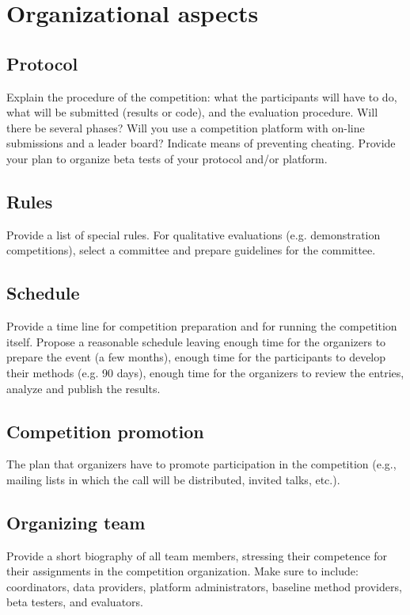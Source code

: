 \documentclass[11pt, oneside]{article}
\begin{document}
\section{Organizational aspects}
\subsection{Protocol}

Explain the procedure of the competition: what the participants will have to do, what will be submitted (results or code), and the evaluation procedure.
Will there be several phases? Will you use a competition platform with on-line submissions and a leader board? Indicate means of preventing cheating.
Provide your plan to organize beta tests of your protocol and/or platform.


\subsection{Rules}

Provide a list of special rules. 
For qualitative evaluations (e.g. demonstration competitions), select a committee and prepare guidelines for the committee.

\subsection{Schedule}

Provide a time line for competition preparation and for running the competition itself. Propose a reasonable schedule leaving enough time for the organizers
to prepare the event (a few months), enough time for the participants to develop their methods (e.g. 90 days), enough time for the organizers to review the entries, analyze and publish the results. 


\subsection{Competition promotion}

The plan that organizers have to promote participation in the competition (e.g., mailing lists in which the call will be distributed, invited talks, etc.).


\subsection{Organizing team}

Provide a short biography of all team members, stressing their competence for their assignments in the competition organization. Make sure to include: coordinators, data providers, platform administrators, baseline method providers, beta testers, and evaluators.
\end{document}
